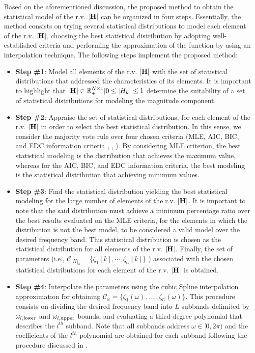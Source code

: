 \documentclass[journal]{IEEEtran}
\begin{document}
Based on the aforementioned discussion, the proposed method to obtain the statistical model of the \ac{r.v.} $\bf |H|$ can be organized in four steps. Essentially, the method consists on trying several statistical distributions to model each element of the \ac{r.v.} $\bf |H|$, choosing the best statistical distribution by adopting well-established criteria and performing the approximation of the function by using an interpolation technique. The following steps implement the proposed method:
\begin{itemize}
	\item \textbf{Step \#1}: Model all elements of the \ac{r.v.} $\bf |H|$ with the set of statistical distributions that addressed the characteristics of its elements. It is important to highlight that ${\bf |H|} \in \mathbb{R}_{+}^{N\times 1}|0 \leq {|H_k|} \leq 1$ determine the suitability of a set of statistical distributions for modeling the magnitude component.
	\item \textbf{Step \#2}: Appraise the set of statistical distributions, for each element of the \ac{r.v.} $\bf |H|$ in order to select the best statistical distribution. In this sense, we consider the majority vote rule \cite{vote} over four chosen criteria (\ac{MLE}, \ac{AIC}, \ac{BIC}, and \ac{EDC} information criteria \cite{Dorea:Sim}, \cite{Cabral:Multi}, \cite{Andrei:Meas}). By considering \ac{MLE} criterion, the best statistical modeling is the distribution that achieves the maximum value, whereas for the \ac{AIC}, \ac{BIC}, and \ac{EDC} information criteria, the best modeling is the statistical distribution that achieving minimum values.
	\item \textbf{Step \#3}: Find the statistical distribution yielding the best statistical modeling for the large number of elements of the \ac{r.v.} $\bf |H|$. It is important to note that the said distribution must achieve a minimum percentage ratio over the best results evaluated on the \ac{MLE} criteria, for the elements in which the distribution is not the best model, to be considered a valid model over the desired frequency band. This statistical distribution is chosen as the statistical distribution for all elements of the \ac{r.v.} $\bf |H|$. Finally, the set of parameters (i.e., $\mathcal{C}_{|H|_k} = \{ \zeta_{1}[k], \cdots, \zeta_{U}[k] \}$ ) associated with the chosen statistical distributions for each element of the \ac{r.v.} $\bf |H|$ is obtained.
    \item \textbf{Step \#4}: Interpolate the parameters using the cubic Spline interpolation approximation for obtaining $\mathcal{C}_{\omega} = \{ \zeta_{1}(\omega), ...., \zeta_{U} (\omega)\}$. This procedure consists on dividing the desired frequency band into $L$ subbands delimited by $\omega_{l,\textnormal{lower}}$ and $\omega_{l,\textnormal{upper}}$ bounds, and evaluating a third-degree polynomial that describes the $l^{th}$ subband. Note that all subbands address $\omega \in [0,2\pi)$ and the coefficients of the $l^{th}$ polynomial are obtained for each subband following the procedure discussed in \cite{ENA,CS1}.      
\end{itemize}
\end{document}
